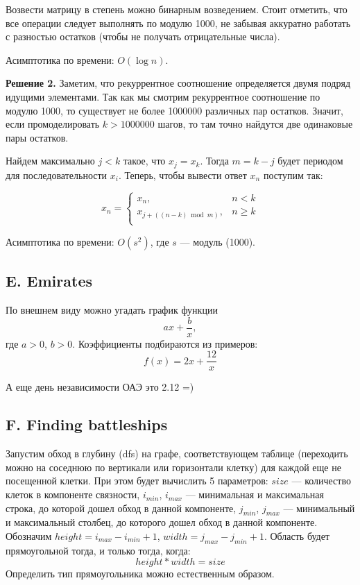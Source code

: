 \documentclass[12pt, a4paper]{article}
\begin{document}
Возвести матрицу в степень можно бинарным возведением. Стоит отметить, что все операции следует выполнять по модулю 1000, не забывая аккуратно работать с разностью остатков (чтобы не получать отрицательные числа). 

Асимптотика по времени: $O(\log n )$.

\textbf{Решение 2.} Заметим, что рекуррентное соотношение определяется двумя подряд идущими элементами. Так как мы смотрим рекуррентное соотношение по модулю 1000, то существует не более 1000000 различных пар остатков. Значит, если промоделировать $k > 1000000$ шагов, то там точно найдутся две одинаковые пары остатков. 

Найдем максимально $j < k$ такое, что $x_j = x_k$. Тогда $m = k - j$ будет периодом для последовательности $x_i$. Теперь, чтобы вывести ответ $x_n$ поступим так: 

$$
x_n = 
\begin{cases}
x_n, & n < k \\
x_{j + ((n - k) \bmod m)}, & n \geqslant k \\
\end{cases}
$$

Асимптотика по времени: $O(s^2)$, где $s$ --- модуль (1000).



\newpage

\subsection*{E. Emirates}
По внешнем виду можно угадать график функции $$a x + \frac{b}{x},$$ где $a > 0$, $b > 0$. Коэффициенты подбираются из примеров:
$$f(x) = 2 x + \frac{12}{x}$$


А еще день независимости ОАЭ это 2.12 =)



\newpage

\subsection*{F. Finding battleships}

Запустим обход в глубину (dfs) на графе, соответствующем таблице (переходить можно на соседнюю по вертикали или горизонтали клетку) для каждой еще не посещенной клетки. При этом будет вычислить 5 параметров: $size$ --- количество клеток в компоненте связности, $i_{min}$, $i_{max}$ --- минимальная и максимальная строка, до которой дошел обход в данной компоненте, $j_{min}$, $j_{max}$ --- минимальный и максимальный столбец, до которого дошел обход в данной компоненте. Обозначим $height = i_{max} - i_{min} + 1$, $width = j_{max} - j_{min} + 1$. 
Область будет прямоугольной тогда, и только тогда, когда:
$$ height * width = size$$
Определить тип прямоугольника можно естественным образом.
\end{document}
